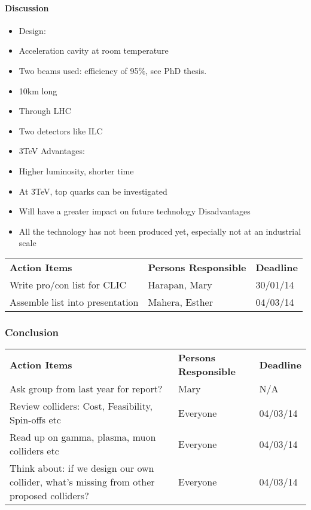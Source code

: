 \paragraph{Discussion}
\begin{itemize}
 \item Design:
\item  Acceleration cavity at room temperature
\item  Two beams used: efficiency of 95\%, see PhD thesis.
\item  10km long
\item  Through LHC
\item  Two detectors like ILC
\item  3TeV
Advantages:
\item  Higher luminosity, shorter time
\item  At 3TeV, top quarks can be investigated
\item  Will have a greater impact on future technology
Disadvantages
\item  All the technology has not been produced yet, especially not at an industrial scale
\end{itemize}

\begin{tabularx}{\textwidth}{X p{4.5cm} p{1.2cm}}
  \textbf{Action Items} & \textbf{Persons Responsible} & \textbf{Deadline} \\
  Write pro/con list for CLIC & Harapan, Mary & 30/01/14 \\
  Assemble list into presentation & Mahera, Esther & 04/03/14 \\
\end{tabularx}

\subsubsection{Conclusion}

\begin{tabularx}{\textwidth}{X p{4.5cm} p{1.2cm}}
  \textbf{Action Items} & \textbf{Persons Responsible} & \textbf{Deadline} \\
  Ask group from last year for report? & Mary & N/A \\
  Review colliders: Cost, Feasibility, Spin-offs etc & Everyone & 04/03/14 \\
  Read up on gamma, plasma, muon colliders etc & Everyone & 04/03/14 \\
 
  Think about: if we design our own collider, what’s missing from other proposed colliders? & Everyone & 04/03/14 \\
\end{tabularx}

